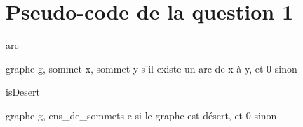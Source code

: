 \documentclass[a4paper,12pt]{article}
\begin{document}
 
\part*{Pseudo-code de la question 1}
 
\begin{algorithm*}
    \caption{arc}
    \begin{algorithmic}
        \REQUIRE graphe g, sommet x, sommet y
         s'il existe un arc de x à y, et 0 sinon
        
            \ENDIF
        \ENDWHILE
    \end{algorithmic}
\end{algorithm*}
 
\begin{algorithm*}
    \caption{isDesert}
    \begin{algorithmic}
        \REQUIRE graphe g, ens\_de\_sommets e
         si le graphe est désert, et 0 sinon
        
            \ENDIF
            
            \ENDIF
        \ENDWHILE
        
    \end{algorithmic}
\end{algorithm*}

 
\end{document}
